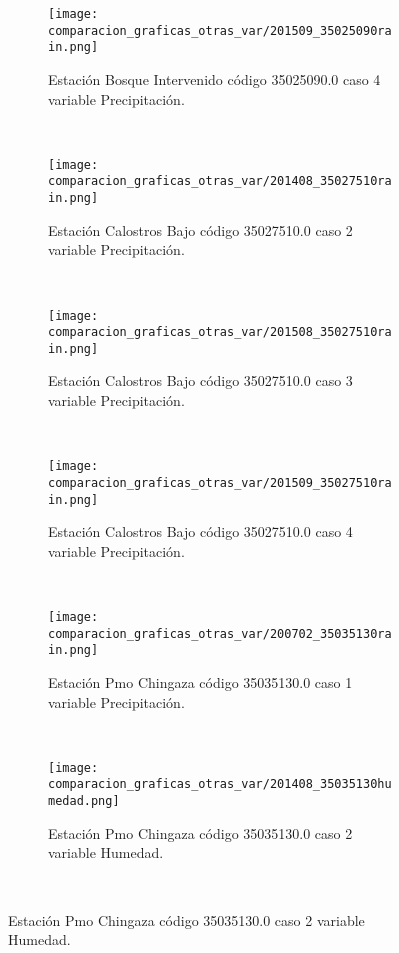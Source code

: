 \begin{figure}[H]
\centering
\begin{subfigure}[normla]{0.4\textwidth}
\caption{Estación Bosque Intervenido   código 35025090.0 caso 4 variable Precipitación.}
\texttt{[image: comparacion\_graficas\_otras\_var/201509\_35025090rain.png]}
\end{subfigure}
~
\begin{subfigure}[normla]{0.4\textwidth}
\caption{Estación Calostros Bajo   código 35027510.0 caso 2 variable Precipitación.}
\texttt{[image: comparacion\_graficas\_otras\_var/201408\_35027510rain.png]}
\end{subfigure}
~
\begin{subfigure}[normla]{0.4\textwidth}
\caption{Estación Calostros Bajo   código 35027510.0 caso 3 variable Precipitación.}
\texttt{[image: comparacion\_graficas\_otras\_var/201508\_35027510rain.png]}
\end{subfigure}
~
\begin{subfigure}[normla]{0.4\textwidth}
\caption{Estación Calostros Bajo   código 35027510.0 caso 4 variable Precipitación.}
\texttt{[image: comparacion\_graficas\_otras\_var/201509\_35027510rain.png]}
\end{subfigure}
~
\begin{subfigure}[normla]{0.4\textwidth}
\caption{Estación Pmo Chingaza código 35035130.0 caso 1 variable Precipitación.}
\texttt{[image: comparacion\_graficas\_otras\_var/200702\_35035130rain.png]}
\end{subfigure}
~
\begin{subfigure}[normla]{0.4\textwidth}
\caption{Estación Pmo Chingaza código 35035130.0 caso 2 variable Humedad.}
\texttt{[image: comparacion\_graficas\_otras\_var/201408\_35035130humedad.png]}
\end{subfigure}
~
\end{figure}
           
